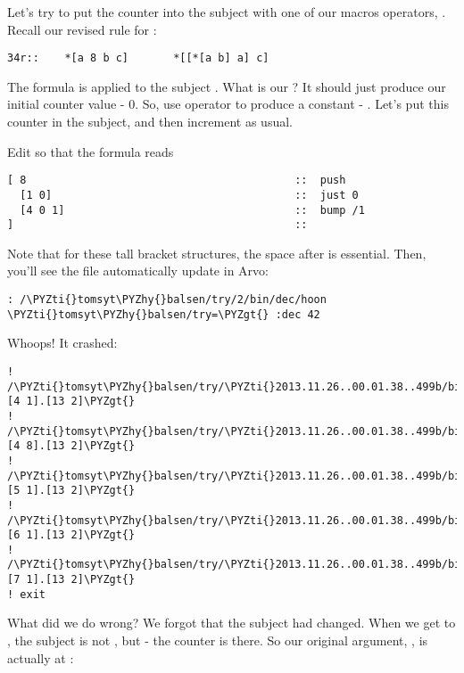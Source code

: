 Let's try to put the counter into the subject with one of our
macros operators, .  Recall our revised rule for :

\begin{framed_shaded}
\begin{Verbatim}[fontsize=\relsize{-2.5},commandchars=\\\{\}]
34r::    *[a 8 b c]       *[[*[a b] a] c]
\end{Verbatim}
\end{framed_shaded}
The formula  is applied to the subject \kode{[*[a b] a]}.  What is
our ?  It should just produce our initial counter value - 0.
So, use operator  to produce a constant - \kode{[1 0]}.  Let's
put this counter in the subject, and then increment as usual.

Edit  so that the formula reads

\begin{framed_shaded}
\begin{Verbatim}[fontsize=\relsize{-2.5},commandchars=\\\{\}]
[ 8                                          ::  push
  [1 0]                                      ::  just 0
  [4 0 1]                                    ::  bump /1
]                                            ::
\end{Verbatim}
\end{framed_shaded}
Note that for these tall bracket structures, the space after \kode{[}
is essential.  Then, you'll see the file automatically update in
Arvo:

\begin{framed_shaded}
\begin{Verbatim}[fontsize=\relsize{-2.5},commandchars=\\\{\}]
: /\PYZti{}tomsyt\PYZhy{}balsen/try/2/bin/dec/hoon
\PYZti{}tomsyt\PYZhy{}balsen/try=\PYZgt{} :dec 42
\end{Verbatim}
\end{framed_shaded}
Whoops!  It crashed:

\begin{framed_shaded}
\begin{Verbatim}[fontsize=\relsize{-2.5},commandchars=\\\{\}]
! /\PYZti{}tomsyt\PYZhy{}balsen/try/\PYZti{}2013.11.26..00.01.38..499b/bin/dec/:\PYZlt{}[4 1].[13 2]\PYZgt{}
! /\PYZti{}tomsyt\PYZhy{}balsen/try/\PYZti{}2013.11.26..00.01.38..499b/bin/dec/:\PYZlt{}[4 8].[13 2]\PYZgt{}
! /\PYZti{}tomsyt\PYZhy{}balsen/try/\PYZti{}2013.11.26..00.01.38..499b/bin/dec/:\PYZlt{}[5 1].[13 2]\PYZgt{}
! /\PYZti{}tomsyt\PYZhy{}balsen/try/\PYZti{}2013.11.26..00.01.38..499b/bin/dec/:\PYZlt{}[6 1].[13 2]\PYZgt{}
! /\PYZti{}tomsyt\PYZhy{}balsen/try/\PYZti{}2013.11.26..00.01.38..499b/bin/dec/:\PYZlt{}[7 1].[13 2]\PYZgt{}
! exit
\end{Verbatim}
\end{framed_shaded}
What did we do wrong?  We forgot that the subject had changed.
When we get to \kode{[4 0 1]}, the subject is not , but \kode{[0 42]} -
the counter is there.  So our original argument, , is
actually at :

